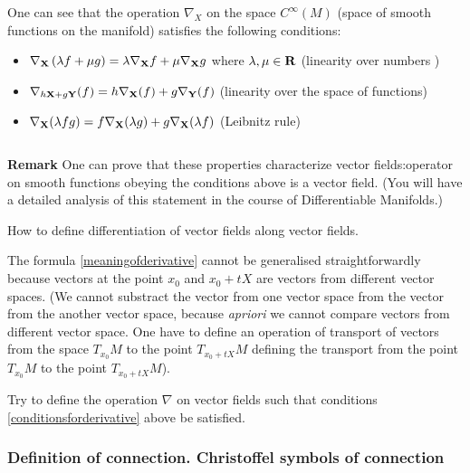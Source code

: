 \documentclass[12pt]{article}
\theoremstyle{theorem}
\numberwithin{equation}{section}
\begin{document}
One can see that the operation $\nabla_X$ on the 
space $C^\infty(M)$ (space of smooth functions on the manifold)
 satisfies the following conditions:
\begin{itemize}
\item
   $\nabla_{{\bf X}}\left(\lambda f+\mu g\right)=
   \lambda\nabla_{{\bf X}}f+\mu\nabla_{{\bf X}}g$
 where $\lambda,\mu\in {\bf R}$ (linearity over numbers )

\item
 $\nabla_{h{\bf X}+g\bf Y}(f)=h\nabla_{{\bf X}}(f)+g\nabla_{\bf Y}(f)$
                   (linearity over the space of functions)


\item

  $\nabla_{\bf X}(\lambda fg)=f\nabla_{\bf X}(\lambda g)+g\nabla_{\bf X}(\lambda f)$                       (Leibnitz rule)

\begin{equation}\label{conditionsforderivative}
\end{equation}

\end{itemize}

{\bf Remark}
One can prove that these properties characterize  vector fields:operator on smooth functions
obeying the conditions above is a vector field.
(You will have a detailed analysis of this statement in the course of Differentiable Manifolds.)

\m

How to define differentiation of vector fields along vector fields.

The formula \eqref{meaningofderivative} cannot be generalised straightforwardly because
vectors at the point $x_0$ and $x_0+t X$ are vectors from different vector spaces.
(We cannot substract the vector from one vector space from the
vector from the another vector space, because {\it apriori}
we cannot compare vectors from different vector space.
One have to define an operation of transport of vectors from the space
$T_{x_0}M$ to the point $T_{x_0+tX}M$ defining the transport
from the point $T_{x_0}M$ to the point $T_{x_0+tX}M$).

Try to define the operation $\nabla$ on vector fields such
that conditions \eqref{conditionsforderivative} above  be satisfied.



\subsubsection{Definition of connection. Christoffel symbols of connection}
\label{defintionofconnection}
\end{document}
